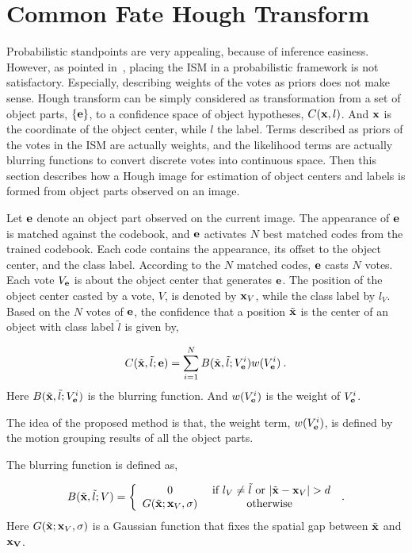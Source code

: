 \section{Common Fate Hough Transform}
\label{pip4}
Probabilistic standpoints are very appealing, because of inference easiness. However, as pointed in~\citep{ac27}, placing the ISM in a probabilistic framework is not satisfactory. Especially, describing weights of the votes as priors does not make sense.
Hough transform can be simply considered as transformation from a set of  object parts, $\{\bf{e}\}$,  to a confidence space of object hypotheses, $C({\bf{x}},l)$. And $\bf{x}$ is the coordinate of the object center, while $l$ the label. Terms described as priors of the votes in the ISM are actually weights, and the likelihood terms are actually blurring functions to convert discrete votes into continuous space. Then this section describes how a Hough image for estimation of object centers and labels is formed from object parts observed on an image.


Let $\bf{e}$ denote an object part observed on the current image. The appearance of $\bf{e}$ is matched against the codebook, and $\bf{e}$ activates $N$ best matched codes from the trained codebook. Each code contains the appearance, its offset to the object center, and the class label. According to the $N$ matched codes, $\bf{e}$ casts $N$ votes. Each vote $V_{\bf{e}}$ is about the object center that generates $\bf{e}$. The position of the object center casted by  a vote, $V$, is denoted by ${\bf{x}}_V$, while the class label by $l_V$. Based on the $N$ votes of $\bf{e}$, the confidence that a position $\tilde{\bf{x}}$ is the center of an object with class label $\tilde{l}$ is given by,

\begin{equation}C({\tilde{\bf{x}}},\tilde{l};{\bf{e}}) = \sum\limits^N_{i=1} {B({\tilde{\bf{x}}},{\tilde{l}};{V_{\bf{e}}^i}) w({V_{\bf{e}}^i})}\:.
\label{eq1}
\end{equation}
Here $B({\tilde{\bf{x}}},{\tilde{l}};{V_{\bf{e}}^i})$ is the blurring function. And $w({V_{\bf{e}}^i})$ is the weight of ${V_{\bf{e}}^i}$.

The idea of the proposed method is that, the weight term, $w({V_{\bf{e}}^i})$, is defined by the motion grouping results of all the object parts.

The blurring function is defined as,

\begin{equation}
B(\tilde{\bf{x}},\tilde l;V)
= \left\{ \begin{array}{*{20}{c}}
   0   &\mbox{  if } {l_V} \ne \tilde{l} \mbox{ or } |\tilde{\bf{x}} - {\bf{x}}_V| > d   \\
   G(\tilde{\bf{x}};{{\bf{x}}_V},\sigma) &\mbox{otherwise}
\end{array} \right. \:.
\label{eq2}
\end{equation}
Here $G(\tilde{\bf{x}};{\bf{x}}_V,\sigma )$ is a Gaussian function that fixes the spatial gap between $\tilde{\bf{x}}$ and ${\bf{x}_V}$.

